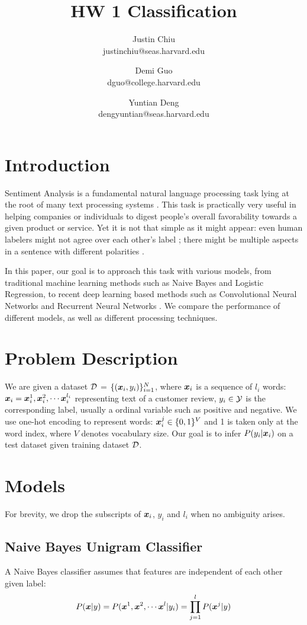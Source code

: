 \documentclass[11pt]{article}
\title{HW 1 Classification}
\author{Justin Chiu \\ justinchiu@seas.harvard.edu \and Demi Guo \\ dguo@college.harvard.edu \and Yuntian Deng \\dengyuntian@seas.harvard.edu }
\begin{document}
\maketitle{}
\section{Introduction}
Sentiment Analysis is a fundamental natural language processing task lying at the root of many text processing systems \citep{nasukawa2003sentiment,miner2012practical,khan2015combining}. 
This task is practically very useful in helping companies or individuals to digest people's overall favorability towards a given product or service. 
Yet it is not that simple as it might appear: even human labelers might not agree over each other's label \citep{liu2010sentiment}; there might be multiple aspects in a sentence with different polarities \citep{lei2016rationalizing}.

In this paper, our goal is to approach this task with various models, from traditional machine learning methods such as Naive Bayes and Logistic Regression, to recent deep learning based methods such as Convolutional Neural Networks \citep{kim2014convolutional} and Recurrent Neural Networks \citep{hochreiter1997long}. We compare the performance of different models, as well as different processing techniques.

\section{Problem Description}
We are given a dataset $\mathcal{D}$ = $\{(\boldsymbol{x}_i, y_i)\}_{i=1}^N$, where $\boldsymbol{x}_i$ is a sequence of $l_i$ words: $\boldsymbol{x}_i = \boldsymbol{x}_{i}^1, \boldsymbol{x}_{i}^2, \cdots \boldsymbol{x}_i^{l_i}$ representing text of a customer review, $y_i\in \mathcal{Y}$ is the corresponding label, usually a ordinal variable such as positive and negative.
We use one-hot encoding to represent words: $\boldsymbol{x}_i^j\in \{0,1\}^{V}$ and 1 is taken only at the word index, where $V$ denotes vocabulary size. Our goal is to infer $P(y_i | \boldsymbol{x}_i)$ on a test dataset given training dataset $\mathcal{D}$.


\section{Models}
For brevity, we drop the subscripts of $\boldsymbol{x}_i$, $y_i$ and $l_i$ when no ambiguity arises.
\subsection{Naive Bayes Unigram Classifier}
A Naive Bayes classifier assumes that features are independent of each other given label:
\begin{equation}
    P(\boldsymbol{x} | y) = P(\boldsymbol{x}^1, \boldsymbol{x}^2, \cdots \boldsymbol{x}^{l} | y_i) = \prod_{j=1}^{l}P(\boldsymbol{x}^j | y)
\end{equation}
\end{document}
